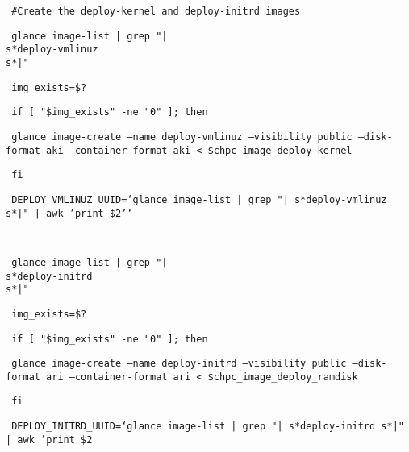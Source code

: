 \documentclass[12pt]{article}
\begin{document}
\begin{bash}\texttt{\small{ \#Create the deploy-kernel and deploy-initrd images}}\end{bash}
\begin{bash}\texttt{\small{     glance image-list | grep "|\\s*deploy-vmlinuz\\s*|"}}\end{bash}
\begin{bash}\texttt{\small{     img\_exists=\$?}}\end{bash}
\begin{bash}\texttt{\small{     if [ "\${img\_exists}" -ne "0" ]; then}}\end{bash}
\begin{bash}\texttt{\small{         glance image-create --name deploy-vmlinuz --visibility public --disk-format aki --container-format aki < \${chpc\_image\_deploy\_kernel}}}\end{bash}
\begin{bash}\texttt{\small{     fi}}\end{bash}
\begin{bash}\texttt{\small{     DEPLOY\_VMLINUZ\_UUID=`glance image-list | grep "|\\s*deploy-vmlinuz\\s*|" | awk '{print \$2}'`}}\end{bash}
\begin{bash}\texttt{\small{ }}\end{bash}
\begin{bash}\texttt{\small{     glance image-list | grep "|\\s*deploy-initrd\\s*|"}}\end{bash}
\begin{bash}\texttt{\small{     img\_exists=\$?}}\end{bash}
\begin{bash}\texttt{\small{     if [ "\${img\_exists}" -ne "0" ]; then}}\end{bash}
\begin{bash}\texttt{\small{         glance image-create --name deploy-initrd --visibility public --disk-format ari --container-format ari < \${chpc\_image\_deploy\_ramdisk}}}\end{bash}
\begin{bash}\texttt{\small{     fi}}\end{bash}
\begin{bash}\texttt{\small{     DEPLOY\_INITRD\_UUID=`glance image-list | grep "|\\s*deploy-initrd\\s*|" | awk '{print \$2}}}\end{bash}
\end{document}
